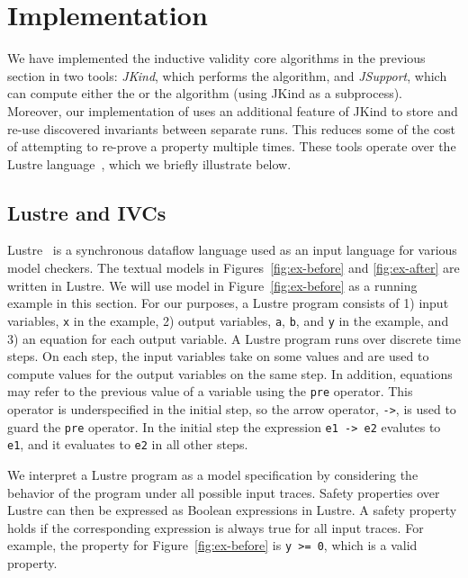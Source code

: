 \section{Implementation}
\label{sec:impl}

We have implemented the inductive validity core algorithms in the
previous section in two tools: {\em JKind}, which performs the \ucalg
algorithm, and {\em JSupport}, which can compute either the \bfalg or
the \ucbfalg algorithm (using JKind as a subprocess). Moreover, our
implementation of \ucbfalg uses an additional feature of JKind to
store and re-use discovered invariants between separate runs. This
reduces some of the cost of attempting to re-prove a property multiple
times. These tools operate over the Lustre
language~\cite{Halbwachs91:lustre}, which we briefly illustrate below.

\subsection{Lustre and IVCs}

Lustre~\cite{Halbwachs91:lustre} is a synchronous dataflow language
used as an input language for various model checkers. The textual
models in Figures~\ref{fig:ex-before} and \ref{fig:ex-after} are
written in Lustre. We will use model in Figure~\ref{fig:ex-before} as
a running example in this section. For our purposes, a Lustre program
consists of 1) input variables, {\tt x} in the example, 2) output
variables, {\tt a}, {\tt b}, and {\tt y} in the example, and 3) an
equation for each output variable. A Lustre program runs over discrete
time steps. On each step, the input variables take on some values and
are used to compute values for the output variables on the same step.
In addition, equations may refer to the previous value of a variable
using the {\tt pre} operator. This operator is underspecified in the
initial step, so the arrow operator, {\tt ->}, is used to guard the
{\tt pre} operator. In the initial step the expression {\tt e1 -> e2}
evalutes to {\tt e1}, and it evaluates to {\tt e2} in all other steps.

We interpret a Lustre program as a model specification by considering
the behavior of the program under all possible input traces. Safety
properties over Lustre can then be expressed as Boolean expressions in
Lustre. A safety property holds if the corresponding expression is
always true for all input traces. For example, the property for
Figure~\ref{fig:ex-before} is {\tt y >= 0}, which is a valid property.


